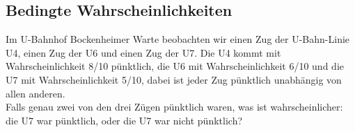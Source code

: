 \documentclass[a4paper]{article}
\begin{document}
\setcounter{section}{2} %
\subsection{Bedingte Wahrscheinlichkeiten}
Im U-Bahnhof Bockenheimer Warte beobachten wir einen Zug der U-Bahn-Linie U4, einen Zug der U6 und einen Zug der U7. Die U4 kommt mit Wahrscheinlichkeit 8/10 pünktlich, die U6 mit Wahrscheinlichkeit 6/10 und die U7 mit Wahrscheinlichkeit 5/10, dabei ist jeder Zug pünktlich unabhängig von allen anderen.\\
Falls genau zwei von den drei Zügen pünktlich waren, was ist wahrscheinlicher: die U7 war pünktlich, oder die U7 war nicht pünktlich?\\\\

\begin{center}
\end{center}
\end{document}
